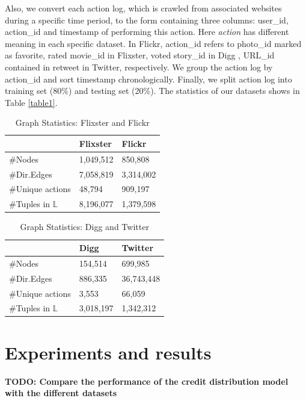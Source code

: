 \documentclass{acm_proc_article-sp}
\begin{document}
Also, we convert each action log, which is crawled from associated websites during a specific time period, to the form containing three columns: user\_id, action\_id and timestamp of performing this action. Here \textit{action} has different meaning in each specific dataset. In Flickr, action\_id refers to photo\_id marked as favorite, rated movie\_id in Flixster, voted story\_id in Digg , URL\_id contained in retweet in Twitter, respectively. We group the action log by action\_id and sort timestamp chronologically. Finally, we split action log into training set (80\%) and testing set (20\%). The statistics of our datasets shows in Table \ref{table1}.


\begin{table}[]
	\centering
	\caption{Graph Statistics: Flixster and Flickr}
	\label{flixster-flickr-table}
	\begin{tabular}{|l|l|l|}
		\hline
		& Flixster  & Flickr \\ \hline
		\#Nodes         & 1,049,512 & 850,808   \\ \hline
		\#Dir.Edges     & 7,058,819 & 3,314,002   \\ \hline
		\#Unique actions     & 48,794    & 909,197    \\ \hline
		\#Tuples in $\mathbb{L}$ & 8,196,077 & 1,379,598  \\ \hline
	\end{tabular}
\end{table}


\begin{table}[]
	\centering
	\caption{Graph Statistics: Digg and Twitter}
	\label{twitter-digg-table}
	\begin{tabular}{|l|l|l|}
		\hline
		&  Digg      & Twitter    \\ \hline
		\#Nodes        & 154,514   & 699,985    \\ \hline
		\#Dir.Edges    & 886,335   & 36,743,448 \\ \hline
		\#Unique actions    & 3,553     & 66,059     \\ \hline
		\#Tuples in $\mathbb{L}$ & 3,018,197 & 1,342,312  \\ \hline
	\end{tabular}
\end{table}


\section{Experiments and results}
\textbf{TODO: Compare the performance of the credit distribution model with the different datasets}
\end{document}
